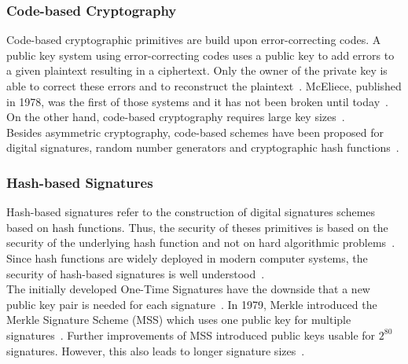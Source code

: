 \subsubsection{Code-based Cryptography}
Code-based cryptographic primitives are build upon error-correcting codes. A public key system using error-correcting codes uses a public key to add errors to a given plaintext resulting in a ciphertext. Only the owner of the private key is able to correct these errors and to reconstruct the plaintext~\parencite{bernstein2017post}. \gls{McEliece}, published in 1978, was the first of those systems and it has not been broken until today~\parencite{mceliece1978public}. On the other hand, code-based cryptography requires large key sizes~\parencite{bernstein2017post}.\\
Besides asymmetric cryptography, code-based schemes have been proposed for digital signatures, random number generators and cryptographic hash functions~\parencite{bernstein2017post}.
\subsubsection{Hash-based Signatures}
Hash-based signatures refer to the construction of digital signatures schemes based on hash functions. Thus, the security of theses primitives is based on the security of the underlying hash function and not on hard algorithmic problems~\parencite{bernstein2017post}. Since hash functions are widely deployed in modern computer systems, the security of hash-based signatures is well understood~\parencite{chen2016report}.\\
The initially developed One-Time Signatures have the downside that a new public key pair is needed for each signature~\parencite{becker2008merkle}. In 1979, Merkle introduced the Merkle Signature Scheme (\gls{MSS}) which uses one public key for multiple signatures~\parencite{merkle1979secrecy}. Further improvements of \gls{MSS} introduced public keys usable for $2^{80}$ signatures. However, this also leads to longer signature sizes~\parencite{becker2008merkle}.

